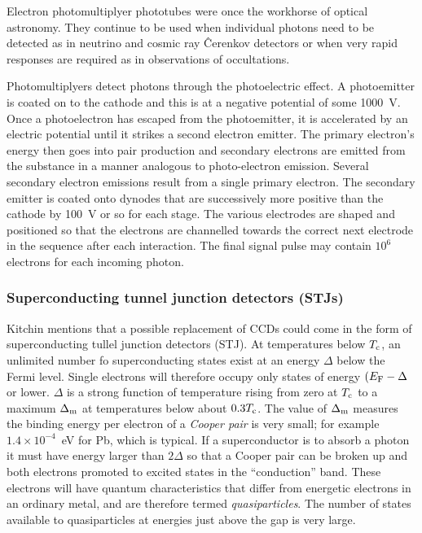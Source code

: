\documentclass{article}
\begin{document}
Electron photomultiplyer phototubes were once the workhorse of optical 
astronomy. They continue to be used when individual photons need to be
detected  as in neutrino and cosmic ray \^Cerenkov detectors or when very
rapid responses are required as in observations of occultations.

Photomultiplyers detect photons through the photoelectric effect. A 
photoemitter is coated on to the cathode and this is at a negative potential
of some 1000~V. Once a photoelectron has escaped from the photoemitter, it
is accelerated by an electric potential until it strikes a second 
electron emitter. The primary electron's energy then goes into pair production
and secondary electrons are emitted from the substance in a manner analogous
to photo-electron emission. Several secondary electron emissions result 
from a single primary electron. The secondary emitter is coated onto dynodes
that are successively more positive than the cathode by 100~V or so for each
stage. The various electrodes are shaped and positioned so that the electrons
are channelled towards the correct next electrode in the sequence after 
each interaction. The final signal pulse may contain $10^6$ electrons for each
incoming photon. 

\subsubsection*{Superconducting tunnel junction detectors (STJs)}

Kitchin mentions that a possible replacement of CCDs could come in the form
of superconducting tullel junction detectors (STJ). At temperatures
below $T_{\rm c}$, an unlimited number fo superconducting states exist
at an energy $\Delta$ below the Fermi level. Single electrons will
therefore occupy only states of energy $(E_{\rm F}-\Delta$ or
  lower. $\Delta$ is a strong function of temperature rising from zero
  at $T_{\rm c}$ to a maximum $\Delta_{\rm m}$ at temperatures below
  about $0.3T_{\rm c}$. The value of $\Delta_{\rm m}$ measures the
  binding energy per electron of a {\it Cooper pair} is very small;
  for example $1.4\times 10^{-4}$~eV for Pb, which is typical. If a
  superconductor is to absorb a photon it must have energy larger than
  $2\Delta$ so that a Cooper pair can be broken up and both electrons
  promoted to excited states in the ``conduction'' band. These
  electrons will have quantum characteristics that differ from
  energetic electrons in an ordinary metal, and are therefore termed
  {\it quasiparticles}. The number of states available to
  quasiparticles at energies just above the gap is very large.
\end{document}
